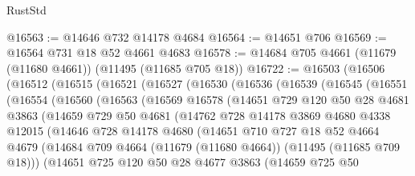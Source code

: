 \begin{lexlean}{RustStd}
\begin{coremodule}
@16563 := @14646 @732 @14178 @4684
@16564 := @14651 @706
@16569 := @16564 @731 @18 @52 @4661 @4683
@16578 := @14684 @705 @4661 (@11679 (@11680 @4661)) (@11495 (@11685 @705 @18))
@16722 := @16503
    (@16506
      (@16512
        (@16515
          (@16521
            (@16527
              (@16530
                (@16536
                  (@16539
                    (@16545
                      (@16551
                        (@16554
                          (@16560
                            (@16563
                              (@16569
                                @16578
                                (@14651
                                  @729
                                  @120
                                  @50
                                  @28
                                  @4681
                                  @3863
                                  (@14659
                                    @729
                                    @50
                                    @4681
                                    (@14762
                                      @728
                                      @14178
                                      @3869
                                      @4680
                                      @4338
                                      @12015
                                      (@14646
                                        @728
                                        @14178
                                        @4680
                                        (@14651
                                          @710
                                          @727
                                          @18
                                          @52
                                          @4664
                                          @4679
                                          (@14684
                                            @709
                                            @4664
                                            (@11679 (@11680 @4664))
                                            (@11495 (@11685 @709 @18)))
                                          (@14651
                                            @725
                                            @120
                                            @50
                                            @28
                                            @4677
                                            @3863
                                            (@14659
                                              @725
                                              @50

\end{coremodule}
\end{lexlean}
